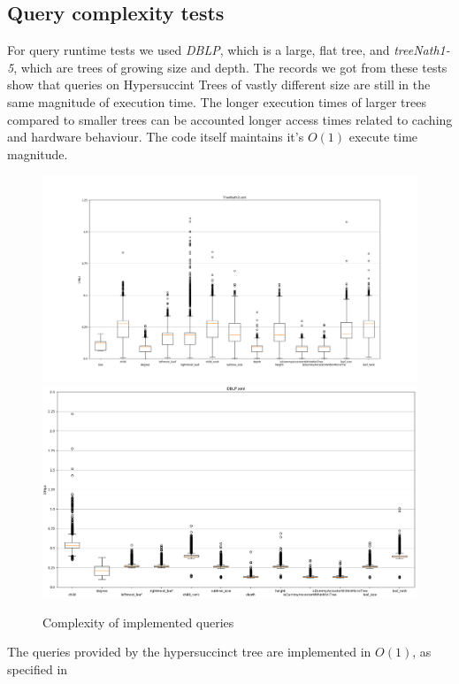 \documentclass{article}
\begin{document}
\subsection{Query complexity tests}
For query runtime tests we used \textit{DBLP}, which is a large, flat tree, and \textit{treeNath1-5}, which are trees of growing size and depth. The records we got from these tests show that queries on Hypersuccint Trees of vastly different size are still in the same magnitude of execution time. The longer execution times of larger trees compared to smaller trees can be accounted longer access times related to caching and hardware behaviour. The code itself maintains it's $O(1)$ execute time magnitude.\\
\begin{figure}[h]
\includegraphics[scale=0.3]{treeNath3.xml}
\includegraphics[scale=0.3]{DBLP_Queries}
\caption{Complexity of implemented queries}
\label{complexQue:image1}
\end{figure}
The queries provided by the hypersuccinct tree are implemented in $O(1)$, as specified in
\end{document}
